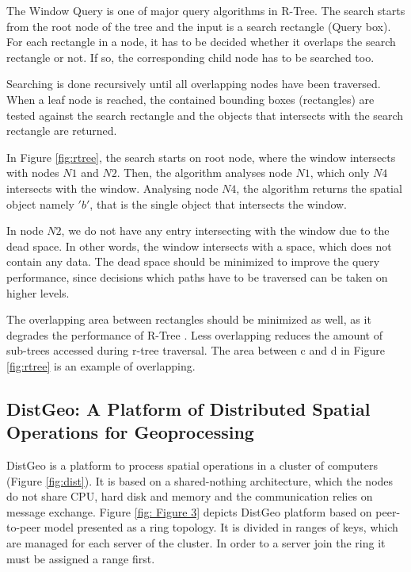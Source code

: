 The Window Query is one of major query algorithms in R-Tree.
The search starts from the root node of the tree and the input is a search rectangle (Query box). 
For each rectangle in a node, it has to be decided whether it overlaps the search rectangle or not. If so, the corresponding child node has to be searched too. 

Searching is done recursively until all overlapping nodes have been traversed. 
When a leaf node is reached, the contained bounding boxes (rectangles) are tested against the search rectangle 
and the objects that intersects with the search rectangle are returned.

In Figure \ref{fig:rtree}, the search starts on root node, where the window intersects with nodes $N1$ and $N2$. Then, the algorithm analyses node $N1$, 
which only $N4$ intersects with the window. Analysing node $N4$, the algorithm returns the spatial object namely $'b'$, that is the single object that intersects the window.

In node $N2$, we do not have any entry intersecting with the window due to the dead space. 
In other words, the window intersects with a space, which does not contain any data.
The dead space should be minimized to improve the query performance, since decisions which paths have to be traversed can be taken on higher levels. 

The overlapping area between rectangles should be minimized as well, as it degrades the performance of R-Tree \cite{beckmann1990r}. 
Less overlapping reduces the amount of sub-trees accessed during r-tree traversal. The area between c and d in Figure \ref{fig:rtree} is an example of overlapping.

\subsection{DistGeo: A Platform of Distributed Spatial Operations for Geoprocessing}
\label{sub:dist_geo}	

DistGeo is a platform to process spatial operations in a cluster of computers (Figure \ref{fig:dist}). 
It is based on a shared-nothing architecture, which the nodes do not share CPU, hard disk and memory and the communication relies on message exchange. 
Figure \ref{fig: Figure 3} depicts DistGeo platform based on peer-to-peer model presented as a ring topology. 
It is divided in ranges of keys, which are managed for each server of the cluster. In order to a server join the ring it must be assigned a range first.

